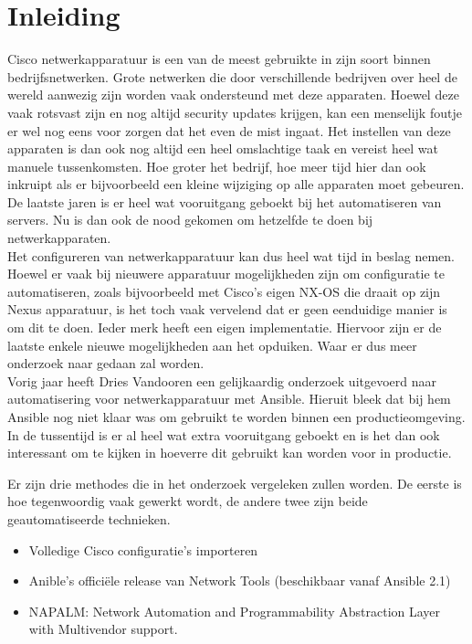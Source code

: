
\chapter{Inleiding}
\label{ch:inleiding}
Cisco netwerkapparatuur is een van de meest gebruikte in zijn soort binnen bedrijfsnetwerken. Grote netwerken die door verschillende bedrijven over heel de wereld aanwezig zijn worden vaak ondersteund met deze apparaten. Hoewel deze vaak rotsvast zijn en nog altijd security updates krijgen, kan een menselijk foutje er wel nog eens voor zorgen dat het even de mist ingaat.\autocite{ciscoLatestUpdate} Het instellen van deze apparaten is dan ook nog altijd een heel omslachtige taak en vereist heel wat manuele tussenkomsten. Hoe groter het bedrijf, hoe meer tijd hier dan ook inkruipt als er bijvoorbeeld een kleine wijziging op alle apparaten moet gebeuren. De laatste jaren is er heel wat vooruitgang geboekt bij het automatiseren van servers. Nu is dan ook de nood gekomen om hetzelfde te doen bij netwerkapparaten. 
\\

Het configureren van netwerkapparatuur kan dus heel wat tijd in beslag nemen. Hoewel er vaak bij nieuwere apparatuur mogelijkheden zijn om configuratie te automatiseren, zoals bijvoorbeeld met Cisco's eigen NX-OS die draait op zijn Nexus apparatuur, is het toch vaak vervelend dat er geen eenduidige manier is om dit te doen. \autocite{ciscoNxosPDF} Ieder merk heeft een eigen implementatie. Hiervoor zijn er de laatste enkele nieuwe mogelijkheden aan het opduiken. Waar er dus meer onderzoek naar gedaan zal worden.
\\

Vorig jaar heeft Dries Vandooren een gelijkaardig onderzoek uitgevoerd naar automatisering voor netwerkapparatuur met Ansible. Hieruit bleek dat bij hem Ansible nog niet klaar was om gebruikt te worden binnen een productieomgeving. In de tussentijd is er al heel wat extra vooruitgang geboekt en is het dan ook interessant om te kijken in hoeverre dit gebruikt kan worden voor in productie.\autocite{Vandooren2015}

Er zijn drie methodes die in het onderzoek vergeleken zullen worden. De eerste is hoe tegenwoordig vaak gewerkt wordt, de andere twee zijn beide geautomatiseerde technieken.
\begin{itemize}
\item Volledige Cisco configuratie's importeren 
\item Anible's officiële release van Network Tools (beschikbaar vanaf Ansible 2.1)
\item NAPALM: Network Automation and Programmability Abstraction Layer with Multivendor support.
\\
\end{itemize}

